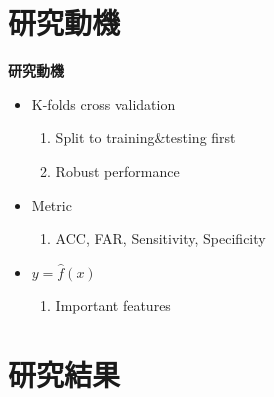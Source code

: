\documentclass[12pt,aspectratio=43]{beamer}
\begin{document}
\section{研究動機}

\linespread{1}
\begin{frame}{\textbf{研究動機}}
\linespread{1.5}

	\begin{itemize}[]
		\item K-folds cross validation
		\begin{enumerate}[]
      \item Split to training\&testing first    
      \item Robust performance
		\end{enumerate}
	\end{itemize}

	\begin{itemize}[]
		\item Metric
		\begin{enumerate}[]
			\item ACC, FAR, Sensitivity, Specificity
		\end{enumerate}
	\end{itemize}
    
  \begin{itemize}[]
		\item $y = \hat{f}(x)$
		\begin{enumerate}[]
			\item Important features
		\end{enumerate}
	\end{itemize}
\end{frame}

\section{研究結果}
\end{document}

